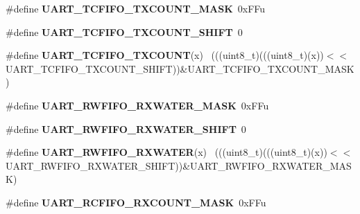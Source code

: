 \begin{DoxyCompactItemize}
\item 
\hypertarget{group___u_a_r_t___register___masks_gab3c6a27ca034de86ac2aa4f5c55781f2}{}\#define {\bfseries U\+A\+R\+T\+\_\+\+T\+C\+F\+I\+F\+O\+\_\+\+T\+X\+C\+O\+U\+N\+T\+\_\+\+M\+A\+S\+K}~0x\+F\+Fu\label{group___u_a_r_t___register___masks_gab3c6a27ca034de86ac2aa4f5c55781f2}

\item 
\hypertarget{group___u_a_r_t___register___masks_gaae504c1c6564913b0daeaf835defa8aa}{}\#define {\bfseries U\+A\+R\+T\+\_\+\+T\+C\+F\+I\+F\+O\+\_\+\+T\+X\+C\+O\+U\+N\+T\+\_\+\+S\+H\+I\+F\+T}~0\label{group___u_a_r_t___register___masks_gaae504c1c6564913b0daeaf835defa8aa}

\item 
\hypertarget{group___u_a_r_t___register___masks_ga127fff58218035fec1e2514fbf4aa920}{}\#define {\bfseries U\+A\+R\+T\+\_\+\+T\+C\+F\+I\+F\+O\+\_\+\+T\+X\+C\+O\+U\+N\+T}(x)                                  ~(((uint8\+\_\+t)(((uint8\+\_\+t)(x))$<$$<$U\+A\+R\+T\+\_\+\+T\+C\+F\+I\+F\+O\+\_\+\+T\+X\+C\+O\+U\+N\+T\+\_\+\+S\+H\+I\+F\+T))\&U\+A\+R\+T\+\_\+\+T\+C\+F\+I\+F\+O\+\_\+\+T\+X\+C\+O\+U\+N\+T\+\_\+\+M\+A\+S\+K)\label{group___u_a_r_t___register___masks_ga127fff58218035fec1e2514fbf4aa920}

\item 
\hypertarget{group___u_a_r_t___register___masks_ga94cd69bba6b852fbd438b8b4b1ab1372}{}\#define {\bfseries U\+A\+R\+T\+\_\+\+R\+W\+F\+I\+F\+O\+\_\+\+R\+X\+W\+A\+T\+E\+R\+\_\+\+M\+A\+S\+K}~0x\+F\+Fu\label{group___u_a_r_t___register___masks_ga94cd69bba6b852fbd438b8b4b1ab1372}

\item 
\hypertarget{group___u_a_r_t___register___masks_ga76a2717965f398da28aadbbebfafa2c8}{}\#define {\bfseries U\+A\+R\+T\+\_\+\+R\+W\+F\+I\+F\+O\+\_\+\+R\+X\+W\+A\+T\+E\+R\+\_\+\+S\+H\+I\+F\+T}~0\label{group___u_a_r_t___register___masks_ga76a2717965f398da28aadbbebfafa2c8}

\item 
\hypertarget{group___u_a_r_t___register___masks_ga3e9217bf32d7c1794d25f5ee42f5088b}{}\#define {\bfseries U\+A\+R\+T\+\_\+\+R\+W\+F\+I\+F\+O\+\_\+\+R\+X\+W\+A\+T\+E\+R}(x)                                  ~(((uint8\+\_\+t)(((uint8\+\_\+t)(x))$<$$<$U\+A\+R\+T\+\_\+\+R\+W\+F\+I\+F\+O\+\_\+\+R\+X\+W\+A\+T\+E\+R\+\_\+\+S\+H\+I\+F\+T))\&U\+A\+R\+T\+\_\+\+R\+W\+F\+I\+F\+O\+\_\+\+R\+X\+W\+A\+T\+E\+R\+\_\+\+M\+A\+S\+K)\label{group___u_a_r_t___register___masks_ga3e9217bf32d7c1794d25f5ee42f5088b}

\item 
\hypertarget{group___u_a_r_t___register___masks_gad56c1815bb877b0a82dcabc58b780b54}{}\#define {\bfseries U\+A\+R\+T\+\_\+\+R\+C\+F\+I\+F\+O\+\_\+\+R\+X\+C\+O\+U\+N\+T\+\_\+\+M\+A\+S\+K}~0x\+F\+Fu\label{group___u_a_r_t___register___masks_gad56c1815bb877b0a82dcabc58b780b54}


\end{DoxyCompactItemize}
